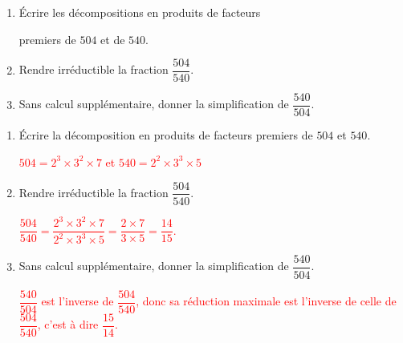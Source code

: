 \begin{exercice*}    
    \begin{enumerate}
        \item Écrire les décompositions en produits de facteurs 
        
        premiers de $504$ et de $540$.
        \item Rendre irréductible la fraction $\dfrac{504}{540}$.
        \item Sans calcul supplémentaire, donner la simplification de $\dfrac{540}{504}$.        
    \end{enumerate}
    
\end{exercice*}
\begin{corrige}
    \begin{enumerate}
        \item Écrire la décomposition en produits de facteurs premiers de $504$ et $540$.
        
        \textcolor{red}{
            $504 = 2^3\times 3^2\times 7$ et $540 = 2^2\times 3^3\times 5$
        }
        \item Rendre irréductible la fraction $\dfrac{504}{540}$.
        
        \textcolor{red}{
            $\dfrac{504}{540} = \dfrac{2^3\times 3^2\times 7}{2^2\times 3^3\times 5} = \dfrac{2\times 7}{3\times 5} = \dfrac{14}{15}$.
        }
        \item Sans calcul supplémentaire, donner la simplification de $\dfrac{540}{504}$.        
        
        \textcolor{red}{
            $\dfrac{540}{504}$ est l'inverse de $\dfrac{504}{540}$, donc sa réduction maximale est l'inverse de celle de $\dfrac{504}{540}$, c'est à dire $\dfrac{15}{14}$.
        }
    \end{enumerate}

\end{corrige}

